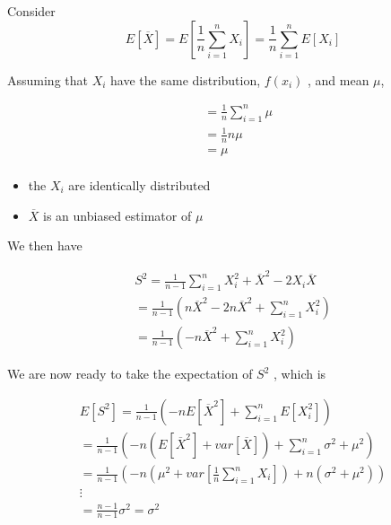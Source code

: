 \documentclass[10pt]{article}
\begin{document}
\begin{lemma}
Consider 
\begin{equation}
	E[\overline{X}] = E[ \frac{1}{n} \sum^n_{i=1} X_i]= \frac{1}{n} \sum^n_{i=1} E[X_i]
	\label{eq:286:exp1}
\end{equation}

Assuming that $ X_i $  have the same distribution, $ f(x_i) $ , and mean $ \mu $,

\begin{equation}
	\begin{split}
		 &= \frac{1}{n} \sum^n_{i=1} \mu  \\
		 &= \frac{1}{n} n \mu \\
		 &= \mu \\
	\end{split}
\end{equation}

\begin{itemize}
	\item the $ X_i $  are identically distributed
	\item $ \overline{X} $  is an unbiased estimator of $ \mu $ 
\end{itemize}

We then have

\begin{multline}
	S^2 = \frac{1}{n-1} \sum^n_{i=1} X_i^2 + \overline{X}^2 - 2X_i\overline{X} \\
	= \frac{1}{n-1} (n\overline{X}^2 - 2n\overline{X}^2 + \sum^n_{i=1} X_i^2) \\
	= \frac{1}{n-1}(-n\overline{X}^2 + \sum^n_{i=1} X_i^2)
\end{multline}


We are now ready to take the expectation of $ S^2 $  , which is

\begin{multline}
	E[S^2] = \frac{1}{n-1}(-nE[\overline{X}^2] + \sum^n_{i=1} E[X_i^2]) \\
	= \frac{1}{n-1}(-n(E[\overline{X}^2] + var[\overline{X}]) + \sum^n_{i=1} \sigma^2 + \mu^2) \\
	= \frac{1}{n-1}(-n(\mu^2 + var[\frac{1}{n}\sum^n_{i=1}X_i]) + n( \sigma^2 + \mu^2)) \\
	\vdots \\
	= \frac{n-1}{n-1} \sigma^2 = \sigma^2
	\label{eq:286_s_squared_expectation}
\end{multline}
\end{lemma}
\end{document}

